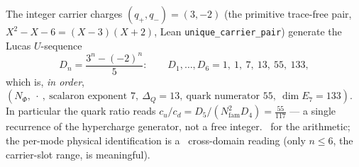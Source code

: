 \documentclass[11pt,a4paper]{article}
\newcommand{\Nfam}{N_{\mathrm{fam}}}
\theoremstyle{definition}
\begin{document}
\begin{keybox}
The integer carrier charges $(q_+,q_-)=(3,-2)$ (the primitive trace-free pair, $X^2{-}X{-}6=(X{-}3)(X{+}2)$,
Lean \texttt{unique\_carrier\_pair}) generate the Lucas $U$-sequence
\[
  D_n=\frac{3^n-(-2)^n}{5}:\qquad D_1{,}\dots{,}D_6=1,\ 1,\ 7,\ 13,\ 55,\ 133,
\]
which is, \emph{in order}, $(N_\Phi,\ \cdot\ ,\ \text{scalaron exponent }7,\ \Delta_Q{=}13,\ \text{quark numerator }55,\ \dim E_7{=}133)$.
In particular the quark ratio reads $c_u/c_d=D_5/(\Nfam^2 D_4)=\tfrac{55}{117}$ --- a single recurrence of the
hypercharge generator, not a free integer. \mE\ for the arithmetic; the per-mode physical identification is a
\mC\ cross-domain reading (only $n\le6$, the carrier-slot range, is meaningful).
\end{keybox}

\end{document}
